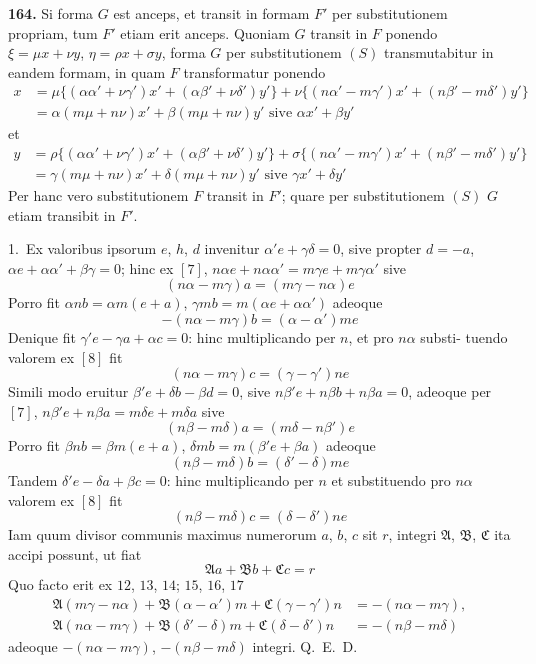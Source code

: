 \documentclass[12pt,a4paper]{article}
\begin{document}
\textbf{164.}
Si forma $G$ est anceps, et transit in formam $F'$ per substitutionem
propriam, tum $F'$ etiam erit anceps. Quoniam $G$ transit in $F$ ponendo
$\xi = \mu x + \nu y$, $\eta = \rho x + \sigma y$,
forma $G$ per substitutionem $(S)$ transmutabitur in eandem formam, in quam $F$
transformatur ponendo
\begin{align*}
x &= \mu\{(\alpha\alpha' + \nu\gamma')x' + (\alpha\beta' + \nu\delta')y'\} + \nu\{(n\alpha' - m\gamma')x' + (n\beta' - m\delta')y'\} \\
&= \alpha(m\mu + n\nu)x' + \beta(m\mu + n\nu)y' \text{ sive } \alpha x' + \beta y'
\end{align*}
et
\begin{align*}
y &= \rho\{(\alpha\alpha' + \nu\gamma')x' + (\alpha\beta' + \nu\delta')y'\} + \sigma\{(n\alpha' - m\gamma')x' + (n\beta' - m\delta')y'\} \\
&= \gamma(m\mu + n\nu)x' + \delta(m\mu + n\nu)y' \text{ sive } \gamma x' + \delta y'
\end{align*}
Per hanc vero substitutionem $F$ transit in $F'$; quare per substitutionem $(S)$
$G$ etiam transibit in $F'$.

1.~Ex valoribus ipsorum $e$, $h$, $d$ invenitur $\alpha'e + \gamma\delta = 0$, sive propter
$d = -a$, $\alpha e + \alpha\alpha' + \beta\gamma = 0$; hinc ex $[7]$, $n\alpha e + n\alpha\alpha' = m\gamma e + m\gamma\alpha'$
sive
\[
(n\alpha - m\gamma)a = (m\gamma - n\alpha)e \tag{12}
\]
Porro fit $\alpha n b = \alpha m(e+a)$, $\gamma m b = m(\alpha e + \alpha\alpha')$ adeoque
\[
-(n\alpha - m\gamma)b = (\alpha - \alpha')me \tag{13}
\]
Denique fit $\gamma'e - \gamma a + \alpha c = 0$: hinc multiplicando per $n$, et pro $n\alpha$ substi-
tuendo valorem ex $[8]$ fit
\[
(n\alpha - m\gamma)c = (\gamma - \gamma')ne \tag{14}
\]
Simili modo eruitur $\beta'e + \delta b - \beta d = 0$, sive $n\beta'e + n\beta b + n\beta a = 0$, adeoque
per $[7]$, $n\beta'e + n\beta a = m\delta e + m\delta a$ sive
\[
(n\beta - m\delta)a = (m\delta - n\beta')e \tag{15}
\]
Porro fit $\beta n b = \beta m(e+a)$, $\delta m b = m(\beta'e + \beta a)$ adeoque
\[
(n\beta - m\delta)b = (\delta' - \delta)me \tag{16}
\]
Tandem $\delta'e - \delta a + \beta c = 0$: hinc multiplicando per $n$ et substituendo pro $n\alpha$
valorem ex $[8]$ fit
\[
(n\beta - m\delta)c = (\delta - \delta')ne \tag{17}
\]
Iam quum divisor communis maximus numerorum $a$, $b$, $c$ sit $r$, integri
$\mathfrak{A}$, $\mathfrak{B}$, $\mathfrak{C}$ ita accipi possunt, ut fiat
\[
\mathfrak{A} a + \mathfrak{B} b + \mathfrak{C} c = r
\]
Quo facto erit ex $12$, $13$, $14$; $15$, $16$, $17$
\begin{align*}
\mathfrak{A}(m\gamma - n\alpha) + \mathfrak{B}(\alpha - \alpha')m + \mathfrak{C}(\gamma - \gamma')n &= -(n\alpha - m\gamma), \\
\mathfrak{A}(n\alpha - m\gamma) + \mathfrak{B}(\delta' - \delta)m + \mathfrak{C}(\delta - \delta')n &= -(n\beta - m\delta)
\end{align*}
adeoque $-(n\alpha - m\gamma)$, $-(n\beta - m\delta)$ integri. Q.~E.~D.
\end{document}
